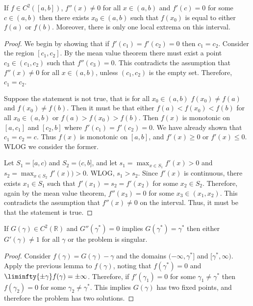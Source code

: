 \documentclass{book}
\begin{document}
\begin{lemma}
If $f \in C^2([a,b])$, $f''(x) \neq 0$ for all $x \in (a,b)$ and $f'(c) = 0$ for some $c \in (a,b)$ then there exists $x_0 \in (a,b)$ such that $f(x_0)$ is equal to either $f(a)$ or $f(b)$.
Moreover, there is only one local extrema on this interval.
\end{lemma}

\begin{proof}
We begin by showing that if $f'(c_1) = f'(c_2) = 0$ then $c_1 = c_2$.
Consider the region $[c_1,c_2]$.
By the mean value theorem there must exist a point $c_3 \in (c_1,c_2)$ such that $f''(c_3) = 0$.
This contradicts the assumption that $f''(x) \neq 0$ for all $x \in (a,b)$, unless $(c_1,c_2)$ is the empty set.
Therefore, $c_1 = c_2$.

Suppose the statement is not true, that is for all $x_0 \in (a,b)$ $f(x_0) \neq f(a)$ and $f(x_0) \neq f(b)$.
Then it must be that either $f(a) < f(x_0) < f(b)$ for all $x_0 \in (a,b)$ or $f(a) > f(x_0) > f(b)$.
Then $f(x)$ is monotonic on $[a,c_1]$ and $[c_2,b]$ where $f'(c_1) = f'(c_2) = 0$.
We have already shown that $c_1 = c_2 = c$.
Thus $f(x)$ is monotonic on $[a,b]$, and $f'(x) \geq 0$ or $f'(x) \leq 0$.
WLOG we consider the former.

Let $S_1 = [a,c)$ and $S_2 = (c,b]$, and let $s_1 = \max_{x \in S_1} f'(x) > 0$ and $s_2 = \max_{x \in S_2} f'(x)) > 0$.
WLOG, $s_1 > s_2$.
Since $f'(x)$ is continuous, there exists $x_1 \in S_1$ such that $f'(x_1) = s_2 = f'(x_2)$ for some $x_2 \in S_2$.
Therefore, again by the mean value theorem, $f''(x_3) = 0$ for some $x_3 \in (x_1,x_2)$.
This contradicts the assumption that $f''(x) \neq 0$ on the interval.
Thus, it must be that the statement is true.
\end{proof}

\begin{cor}
If $G(\gamma) \in C^2(\mathbb{R})$ and $G''(\gamma^*) = 0$ implies $G(\gamma^*) = \gamma^*$ then either $G'(\gamma) \neq 1$ for all $\gamma$ or the problem is singular.
\end{cor}

\begin{proof}
Consider $f(\gamma) = G(\gamma) - \gamma$ and the domains $(-\infty,\gamma^*]$ and $[\gamma^*,\infty)$.
Apply the previous lemma to $f(\gamma)$, noting that $f(\gamma^*) = 0$ and $\liminfty{\pm \gamma} f(\gamma) = \pm \infty$.
Therefore, if $f'(\gamma_1) = 0$ for some $\gamma_1 \neq \gamma^*$ then $f(\gamma_2) = 0$ for some $\gamma_2 \neq \gamma^*$.
This implies $G(\gamma)$ has two fixed points, and therefore the problem has two solutions.
\end{proof}
\end{document}
